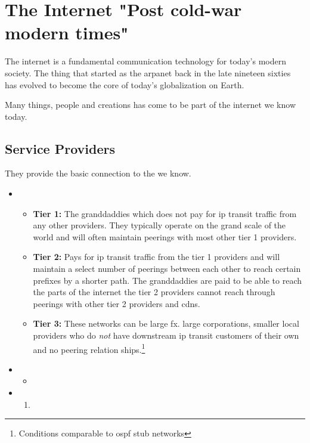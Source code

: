 \chapter[Internet]{The Internet {\footnotesize "Post cold-war modern times"}}

The internet is a fundamental communication technology for today's modern society. The thing that started as the \Gls{arpanet}\cite{wiki:ARPANET} back in the late nineteen sixties has evolved to become the core of today's globalization on Earth.

Many things, people and creations has come to be part of the internet we know today.

\section[SP]{Service Providers}

They provide the basic connection to the  we know.

\begin{itemize}
    \item {}
    \begin{itemize}
        \item \textbf{Tier 1:} The granddaddies which does not pay for \Gls{ip} transit traffic from any other providers. They typically operate on the grand scale of the world and will often maintain peerings with most other tier 1 providers.
        \item \textbf{Tier 2:} Pays for \Gls{ip} transit traffic from the tier 1 providers and will maintain a select number of peerings between each other to reach certain prefixes by a shorter path. The granddaddies are paid to be able to reach the parts of the internet the tier 2 providers cannot reach through peerings with other tier 2 providers and \Glspl{cdn}.
        \item \textbf{Tier 3:} These networks can be large fx. large corporations, smaller local providers who do \textit{not} have downstream \Gls{ip} transit customers of their own and no peering relation ships.\footnote{Conditions comparable to \Gls{ospf} stub networks}
    \end{itemize}
    \item {}
    \begin{itemize}
        \item
    \end{itemize}
    \item {}
    \begin{enumerate}
        \item
    \end{enumerate}
\end{itemize}


